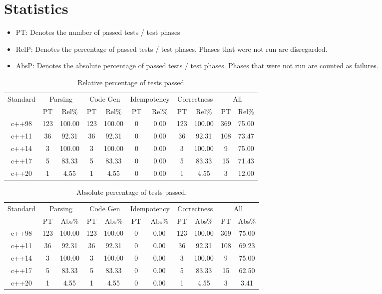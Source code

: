\documentclass{article}
\begin{document}
\section{Statistics}\begin{itemize}
            \item PT: Denotes the number of passed tests / test phases
            \item RelP: Denotes the percentage of passed tests / test phases. Phases that were not run are disregarded.
            \item AbsP: Denotes the absolute percentage of passed tests / test phases. Phases that were not run are counted as failures.
            \end{itemize}
\begin{table}[h]
\begin{center}
\footnotesize
\begin{tabular}{ |c|c|c|c|c|c|c|c|c|c|c| }
\multicolumn{1}{|c|}{Standard} & \multicolumn{2}{c|}{Parsing} & \multicolumn{2}{c|}{Code Gen} & \multicolumn{2}{c|}{Idempotency} & \multicolumn{2}{c|}{Correctness} & \multicolumn{2}{c|}{All} \\
  & PT & Rel\% & PT & Rel\% & PT & Rel\% & PT & Rel\% & PT & Rel\% \\
\midrule
c++98 & 123 & 100.00 & 123 & 100.00 & 0 & 0.00 & 123 & 100.00 & 369 & 75.00 \\
c++11 & 36 & 92.31 & 36 & 92.31 & 0 & 0.00 & 36 & 92.31 & 108 & 73.47 \\
c++14 & 3 & 100.00 & 3 & 100.00 & 0 & 0.00 & 3 & 100.00 & 9 & 75.00 \\
c++17 & 5 & 83.33 & 5 & 83.33 & 0 & 0.00 & 5 & 83.33 & 15 & 71.43 \\
c++20 & 1 & 4.55 & 1 & 4.55 & 0 & 0.00 & 1 & 4.55 & 3 & 12.00 \\
\end{tabular}
\end{center}
\caption{Relative percentage of tests passed}
\end{table}\begin{table}[h]
\begin{center}
\footnotesize
\begin{tabular}{ |c|c|c|c|c|c|c|c|c|c|c| }
\multicolumn{1}{|c|}{Standard} & \multicolumn{2}{c|}{Parsing} & \multicolumn{2}{c|}{Code Gen} & \multicolumn{2}{c|}{Idempotency} & \multicolumn{2}{c|}{Correctness} & \multicolumn{2}{c|}{All} \\
  & PT & Abs\% & PT & Abs\% & PT & Abs\% & PT & Abs\% & PT & Abs\% \\
\midrule
c++98 & 123 & 100.00 & 123 & 100.00 & 0 & 0.00 & 123 & 100.00 & 369 & 75.00 \\
c++11 & 36 & 92.31 & 36 & 92.31 & 0 & 0.00 & 36 & 92.31 & 108 & 69.23 \\
c++14 & 3 & 100.00 & 3 & 100.00 & 0 & 0.00 & 3 & 100.00 & 9 & 75.00 \\
c++17 & 5 & 83.33 & 5 & 83.33 & 0 & 0.00 & 5 & 83.33 & 15 & 62.50 \\
c++20 & 1 & 4.55 & 1 & 4.55 & 0 & 0.00 & 1 & 4.55 & 3 & 3.41 \\
\end{tabular}
\end{center}
\caption{Absolute percentage of tests passed.}
\end{table}
\end{document}
